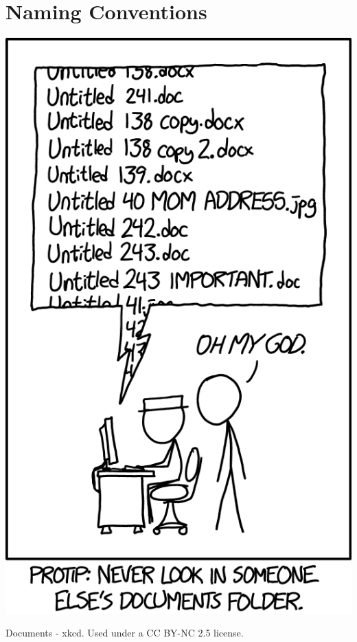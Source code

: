 \documentclass[
  letterpaper,
  DIV=11,
  numbers=noendperiod]{scrreprt}
\begin{document}

\chapter*{Naming Conventions}\label{naming-conventions}


\includegraphics{images/xkcd-file-naming.png}

Documents - xkcd. Used under a CC BY-NC 2.5 license.
\end{document}
